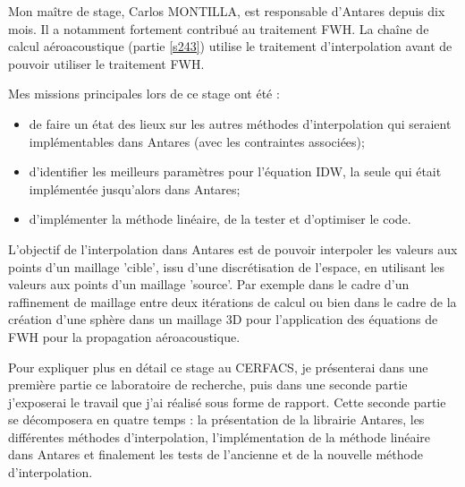 Mon maître de stage, Carlos MONTILLA, est responsable d'Antares depuis dix mois. Il a notamment fortement contribué au traitement \ac{FWH}. La chaîne de calcul aéroacoustique (partie \ref{s243}) utilise le traitement d'interpolation avant de pouvoir utiliser le traitement FWH.

Mes missions principales lors de ce stage ont été :

\begin{itemize}
    \item de faire un état des lieux sur les autres méthodes d'interpolation qui seraient implémentables dans Antares (avec les contraintes associées);
    \item d'identifier les meilleurs paramètres pour l'équation \ac{IDW}, la seule qui était implémentée jusqu'alors dans Antares; %
    \item d'implémenter la méthode linéaire, de la tester et d'optimiser le code.  %
\end{itemize}




L'objectif de l'interpolation dans Antares est de pouvoir interpoler les valeurs aux points d'un maillage 'cible', issu d'une discrétisation de l'espace, en utilisant les valeurs aux points d'un maillage 'source'.
Par exemple dans le cadre d'un raffinement de maillage entre deux itérations de calcul ou bien dans le cadre de la création d'une sphère dans un maillage 3D pour l'application des équations de FWH pour la propagation aéroacoustique.

Pour expliquer plus en détail ce stage au CERFACS, je présenterai dans une première partie ce laboratoire de recherche, puis dans une seconde partie j'exposerai le travail que j'ai réalisé sous forme de rapport. Cette seconde partie se décomposera en quatre temps : la présentation de la librairie Antares, les différentes méthodes d'interpolation, l'implémentation de la méthode linéaire dans Antares et finalement les tests de l'ancienne et de la nouvelle méthode d'interpolation.